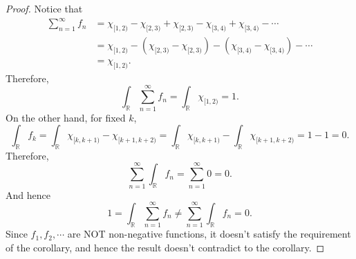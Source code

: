 \begin{proof}
    Notice that 
    \[
        \begin{aligned}
        \sum_{n=1}^{\infty} f_n &= \chi_{[1,2)} - \chi_{[2,3)} + \chi_{[2,3)} - \chi_{[3,4)} + \chi_{[3,4)} -\cdots \\
        &= \chi_{[1,2)} - (\chi_{[2,3)} - \chi_{[2,3)}) - (\chi_{[3,4)} - \chi_{[3,4)}) -\cdots \\
        &= \chi_{[1,2)}.
        \end{aligned}
    \]
    Therefore,
    \[
        \int_\mathbb{R} \sum_{n=1}^\infty f_n = \int_\mathbb{R} \chi_{[1,2)} = 1.
    \]
    On the other hand, for fixed $k$, 
    \[
        \int_\mathbb{R} f_k = \int_\mathbb{R} \chi_{[k,k+1)} - \chi_{[k+1,k+2)} = \int_\mathbb{R} \chi_{[k,k+1)} - \int_\mathbb{R} \chi_{[k+1,k+2)} = 1-1 = 0.
    \]
    Therefore,
    \[
        \sum_{n=1}^\infty \int_\mathbb{R} f_n = \sum_{n=1}^\infty 0 = 0.
    \]
    And hence
    \[
        1 =\int_\mathbb{R}\sum_{n=1}^\infty f_n \ne \sum_{n=1}^\infty \int_\mathbb{R} f_n = 0.
    \]
    Since $f_1, f_2, \cdots$ are NOT non-negative functions, it doesn't satisfy the requirement of the corollary, and hence the result doesn't contradict to the corollary. 
\end{proof}

